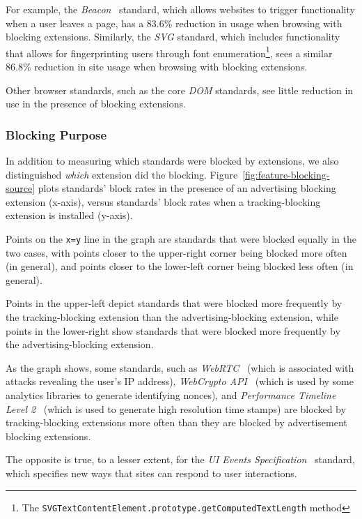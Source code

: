 For example, the \textit{Beacon}~\cite{beaconapi} standard, which allows
websites to trigger functionality when a user leaves a page, has a 83.6\%
reduction in usage when browsing with blocking extensions.  Similarly, the
\emph{SVG} standard, which includes functionality that allows for
fingerprinting users through font enumeration\footnote{The
\texttt{SVGTextContentElement.prototype.getComputedTextLength} method}, sees a
similar 86.8\% reduction in site usage when browsing with blocking extensions.

Other browser standards, such as the core \textit{DOM} standards, see little
reduction in use in the presence of blocking extensions.


\subsubsection{Blocking Purpose}


In addition to measuring which standards were blocked by extensions, we also
distinguished \emph{which} extension did the blocking.
Figure~\ref{fig:feature-blocking-source} plots standards' block rates in the
presence of an advertising blocking extension (x-axis), versus standards' block
rates when a tracking-blocking extension is installed (y-axis).

Points on the \texttt{x=y} line in the graph are standards that were blocked
equally in the two cases, with points closer to the upper-right corner being
blocked more often (in general), and points closer to the lower-left corner
being blocked less often (in general).

Points in the upper-left depict standards that were blocked more frequently by
the tracking-blocking extension than the advertising-blocking extension, while
points in the lower-right show standards that were blocked more frequently by
the advertising-blocking extension.

As the graph shows, some standards, such as \emph{WebRTC}~\cite{webrtcw3c}
(which is associated with attacks revealing the user's IP address),
\emph{WebCrypto API}~\cite{webcryptow3c} (which is used by some analytics
libraries to generate identifying nonces), and \emph{Performance Timeline Level
2}~\cite{perftimingw3c} (which is used to generate high resolution time stamps)
are blocked by tracking-blocking extensions more often than they are blocked by
advertisement blocking extensions.

The opposite is true, to a lesser extent, for the \emph{UI Events
Specification}~\cite{uievents3c} standard, which specifies new ways that sites
can respond to user interactions.
